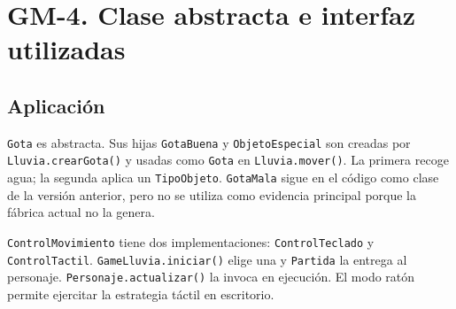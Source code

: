 \section{GM-4. Clase abstracta e interfaz utilizadas}

\subsection*{Aplicación}
\texttt{Gota} es abstracta. Sus hijas \texttt{GotaBuena} y \texttt{ObjetoEspecial} son creadas por \texttt{Lluvia.crearGota()} y usadas como \texttt{Gota} en \texttt{Lluvia.mover()}. La primera recoge agua; la segunda aplica un \texttt{TipoObjeto}. \texttt{GotaMala} sigue en el código como clase de la versión anterior, pero no se utiliza como evidencia principal porque la fábrica actual no la genera.

\texttt{ControlMovimiento} tiene dos implementaciones: \texttt{ControlTeclado} y \texttt{ControlTactil}. \texttt{GameLluvia.iniciar()} elige una y \texttt{Partida} la entrega al personaje. \texttt{Personaje.actualizar()} la invoca en ejecución. El modo ratón permite ejercitar la estrategia táctil en escritorio.


